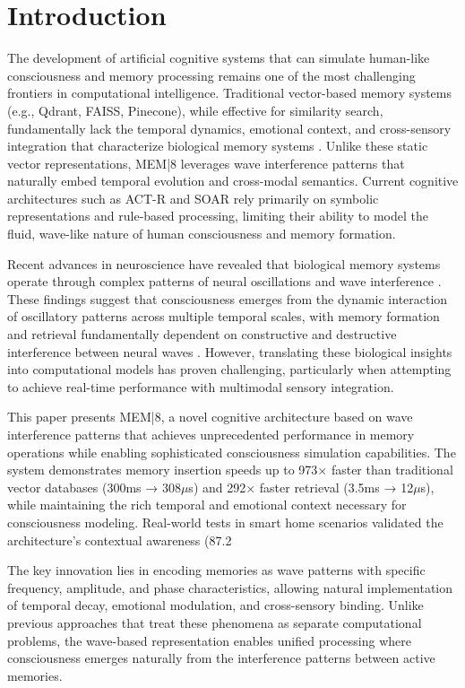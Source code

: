 \documentclass[11pt,letterpaper]{article}
\begin{document}
\section{Introduction}

The development of artificial cognitive systems that can simulate human-like consciousness and memory processing remains one of the most challenging frontiers in computational intelligence. Traditional vector-based memory systems (e.g., Qdrant, FAISS, Pinecone), while effective for similarity search, fundamentally lack the temporal dynamics, emotional context, and cross-sensory integration that characterize biological memory systems \cite{tulving1985memory, baddeley2012working}. Unlike these static vector representations, MEM|8 leverages wave interference patterns that naturally embed temporal evolution and cross-modal semantics. Current cognitive architectures such as ACT-R \cite{anderson2004integrated} and SOAR \cite{laird2012soar} rely primarily on symbolic representations and rule-based processing, limiting their ability to model the fluid, wave-like nature of human consciousness and memory formation.

Recent advances in neuroscience have revealed that biological memory systems operate through complex patterns of neural oscillations and wave interference \cite{buzsaki2006rhythms, fries2015rhythms}. These findings suggest that consciousness emerges from the dynamic interaction of oscillatory patterns across multiple temporal scales, with memory formation and retrieval fundamentally dependent on constructive and destructive interference between neural waves \cite{jensen2007cross}. However, translating these biological insights into computational models has proven challenging, particularly when attempting to achieve real-time performance with multimodal sensory integration.

This paper presents MEM|8, a novel cognitive architecture based on wave interference patterns that achieves unprecedented performance in memory operations while enabling sophisticated consciousness simulation capabilities. The system demonstrates memory insertion speeds up to 973× faster than traditional vector databases (300ms → 308$\mu$s) and 292× faster retrieval (3.5ms → 12$\mu$s), while maintaining the rich temporal and emotional context necessary for consciousness modeling. Real-world tests in smart home scenarios validated the architecture's contextual awareness (87.2%

The key innovation lies in encoding memories as wave patterns with specific frequency, amplitude, and phase characteristics, allowing natural implementation of temporal decay, emotional modulation, and cross-sensory binding. Unlike previous approaches that treat these phenomena as separate computational problems, the wave-based representation enables unified processing where consciousness emerges naturally from the interference patterns between active memories.
\end{document}
